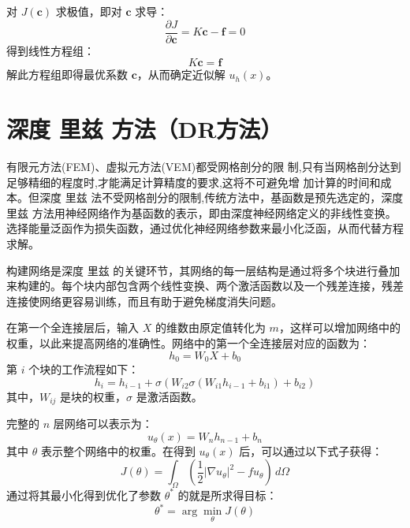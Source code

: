 \documentclass[engineeringmaster]{hquThesis}
\begin{document}
对 \( J(\mathbf{c}) \) 求极值，即对 \( \mathbf{c} \) 求导：
    \[
    \frac{\partial J}{\partial \mathbf{c}} = K \mathbf{c} - \mathbf{f} = 0
    \]
得到线性方程组：
    \begin{equation}
        K \mathbf{c} = \mathbf{f}
        \label{eq:linear_system}
    \end{equation}
解此方程组即得最优系数 \( \mathbf{c} \)，从而确定近似解 \( u_h(x) \)。
    


\section{深度 里兹 方法（DR方法）}
有限元方法(FEM)、虚拟元方法(VEM)都受网格剖分的限  制,只有当网格剖分达到足够精细的程度时,才能满足计算精度的要求,这将不可避免增  加计算的时间和成本。但深度 里兹 法不受网格剖分的限制,传统方法中，基函数是预先选定的，深度 里兹 方法用神经网络作为基函数的表示，即由深度神经网络定义的非线性变换。选择能量泛函作为损失函数，通过优化神经网络参数来最小化泛函，从而代替方程求解。

构建网络是深度 里兹 的关键环节，其网络的每一层结构是通过将多个块进行叠加来构建的。每个块内部包含两个线性变换、两个激活函数以及一个残差连接，残差连接使网络更容易训练，而且有助于避免梯度消失问题。

在第一个全连接层后，输入 \( X \) 的维数由原定值转化为 \( m \)，这样可以增加网络中的权重，以此来提高网络的准确性。网络中的第一个全连接层对应的函数为：
\begin{equation}
    h_0 = W_0 X + b_0
    \label{eq:fc_layer}
    \end{equation}
第 \( i \) 个块的工作流程如下：
\begin{equation}
    h_i = h_{i-1} + \sigma(W_{i2} \sigma(W_{i1} h_{i-1} + b_{i1}) + b_{i2})
    \label{eq:block}
    \end{equation}
其中，\( W_{ij} \) 是块的权重，\( \sigma \) 是激活函数。

完整的 \( n \) 层网络可以表示为：
\begin{equation}
    u_{\theta}(x) = W_n h_{n-1} + b_n
    \label{eq:network_output}
    \end{equation}
其中 \( \theta \) 表示整个网络中的权重。在得到 \( u_{\theta}(x) \) 后，可以通过以下式子获得：
\begin{equation}
    J(\theta) = \int_{\Omega} \left( \frac{1}{2} |\nabla u_{\theta}|^2 - f u_{\theta} \right) \, d\Omega
    \label{eq:loss_function}
    \end{equation}
通过将其最小化得到优化了参数 \( \theta^* \) 的就是所求得目标：
\begin{equation}
    \theta^* = \arg\min_{\theta} J(\theta)
    \label{eq:optimal_theta}
    \end{equation}
\end{document}
